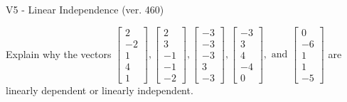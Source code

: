 \begin{exercise}
  \begin{exerciseTitle}V5 - Linear Independence (ver. 460)\end{exerciseTitle}
  \begin{exerciseStatement}
    Explain why the vectors \(\left[\begin{array}{r}
2 \\
-2 \\
1 \\
4 \\
1
\end{array}\right] , \left[\begin{array}{r}
2 \\
3 \\
-1 \\
-1 \\
-2
\end{array}\right] , \left[\begin{array}{r}
-3 \\
-3 \\
-3 \\
3 \\
-3
\end{array}\right] , \left[\begin{array}{r}
-3 \\
3 \\
4 \\
-4 \\
0
\end{array}\right] , \text{ and } \left[\begin{array}{r}
0 \\
-6 \\
1 \\
1 \\
-5
\end{array}\right]\) are linearly dependent or linearly independent.	



\end{exerciseStatement}
\end{exercise}
